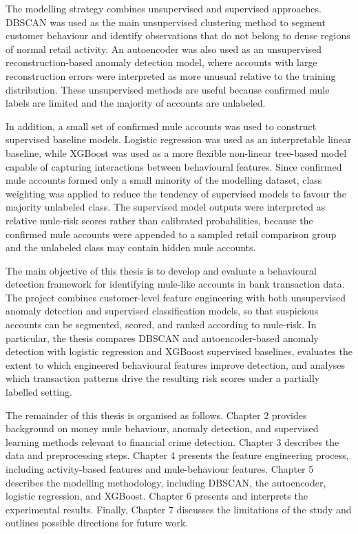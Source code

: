 The modelling strategy combines unsupervised and supervised approaches. DBSCAN was used as the main unsupervised clustering method to segment customer behaviour and identify observations that do not belong to dense regions of normal retail activity. An autoencoder was also used as an unsupervised reconstruction-based anomaly detection model, where accounts with large reconstruction errors were interpreted as more unusual relative to the training distribution. These unsupervised methods are useful because confirmed mule labels are limited and the majority of accounts are unlabeled.

In addition, a small set of confirmed mule accounts was used to construct supervised baseline models. Logistic regression was used as an interpretable linear baseline, while XGBoost was used as a more flexible non-linear tree-based model capable of capturing interactions between behavioural features. Since confirmed mule accounts formed only a small minority of the modelling dataset, class weighting was applied to reduce the tendency of supervised models to favour the majority unlabeled class. The supervised model outputs were interpreted as relative mule-risk scores rather than calibrated probabilities, because the confirmed mule accounts were appended to a sampled retail comparison group and the unlabeled class may contain hidden mule accounts.

The main objective of this thesis is to develop and evaluate a behavioural detection framework for identifying mule-like accounts in bank transaction data. The project combines customer-level feature engineering with both unsupervised anomaly detection and supervised classification models, so that suspicious accounts can be segmented, scored, and ranked according to mule-risk. In particular, the thesis compares DBSCAN and autoencoder-based anomaly detection with logistic regression and XGBoost supervised baselines, evaluates the extent to which engineered behavioural features improve detection, and analyses which transaction patterns drive the resulting risk scores under a partially labelled setting.

The remainder of this thesis is organised as follows. Chapter 2 provides background on money mule behaviour, anomaly detection, and supervised learning methods relevant to financial crime detection. Chapter 3 describes the data and preprocessing steps. Chapter 4 presents the feature engineering process, including activity-based features and mule-behaviour features. Chapter 5 describes the modelling methodology, including DBSCAN, the autoencoder, logistic regression, and XGBoost. Chapter 6 presents and interprets the experimental results. Finally, Chapter 7 discusses the limitations of the study and outlines possible directions for future work.




